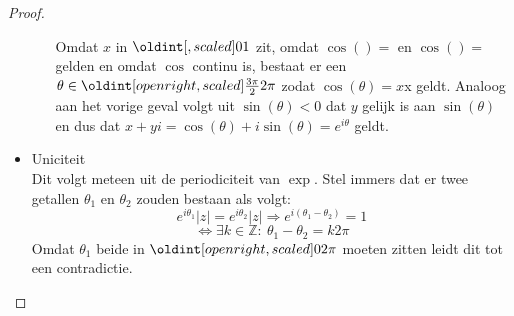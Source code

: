 \documentclass[main.tex]{subfiles}
\begin{document}
\begin{bpr}
\begin{proof}
\begin{itemize}
\begin{itemize}
        Omdat $x$ in $\interval{0}{1}$ zit, omdat $\cos()=$ en $\cos\left(\right)=$ gelden en omdat $\cos$ continu is, bestaat er een $\theta \in \interval[open right]{\frac{3\pi}{2}}{2\pi}$ zodat $\cos(\theta) = x$x geldt.
        Analoog aan het vorige geval volgt uit $\sin(\theta)<0$ dat $y$ gelijk is aan $\sin(\theta)$ en dus dat $x+yi = \cos(\theta) + i \sin(\theta) = e^{i\theta}$ geldt.
      \end{itemize}
    \item Uniciteit\\
      Dit volgt meteen uit de periodiciteit van $\exp$.
      Stel immers dat er twee getallen $\theta_{1}$ en $\theta_{2}$ zouden bestaan als volgt:
      \[ e^{i\theta_{1}}|z| = e^{i\theta_{2}}|z| \Rightarrow e^{i(\theta_{1}-\theta_{2})} = 1 \]
      \[ \Leftrightarrow \exists k\in \mathbb{Z}:\ \theta_{1}-\theta_{2} = k2\pi \]
      Omdat $\theta_{1}$ beide in $\interval[open right]{0}{2\pi}$ moeten zitten leidt dit tot een contradictie.
    \end{itemize}
  \end{proof}
\end{bpr}
\end{document}
